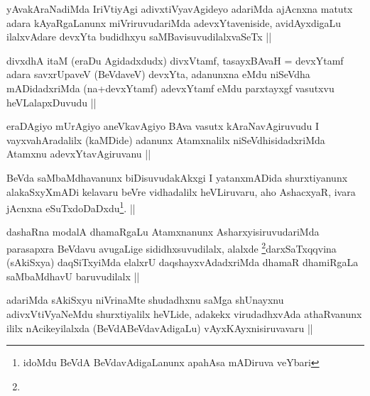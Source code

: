 \begin{artha}
yAvakAraNadiMda IriVtiyAgi adivxtiVyavAgideyo adariMda ajAcnxna matutx
adara kAyaRgaLanunx miVriruvudariMda adevxYtaveniside, avidAyxdigaLu
ilalxvAdare devxYta budidhxyu saMBavisuvudilalxvaSeTx ||
\end{artha}


\begin{artha}
divxdhA itaM (eraDu Agidadxdudx) divxVtamf, tasayxBAvaH = devxYtamf
adara savxrUpaveV (BeVdaveV) devxYta, adanunxna eMdu niSeVdha
mADidadxriMda (na+devxYtamf) adevxYtamf eMdu parxtayxgf vasutxvu
heVLalapxDuvudu ||  
\end{artha}


\begin{artha}
eraDAgiyo mUrAgiyo aneVkavAgiyo BAva vasutx kAraNavAgiruvudu I
vayxvahAradalilx (kaMDide) adanunx Atamxnalilx niSeVdhisidadxriMda
Atamxnu adevxYtavAgiruvanu ||
\end{artha}


\begin{artha}
BeVda saMbaMdhavanunx biDisuvudakAkxgi I yatanxmADida shurxtiyanunx
alakaSxyXmADi kelavaru beVre vidhadalilx heVLiruvaru, aho AshacxyaR,
ivara jAcnxna eSuTxdoDaDxdu\footnote[1]{idoMdu BeVdA BeVdavAdigaLanunx
apahAsa mADiruva veYbari}. ||
\end{artha}

\begin{artha}
dashaRna modalA dhamaRgaLu Atamxnanunx AsharxyisiruvudariMda
parasapxra BeVdavu avugaLige sididhxsuvudilalx,
alalxde \footnote[1]{}darxSaTxqqvina (sAkiSxya) daqSiTxyiMda elalxrU
daqshayxvAdadxriMda dhamaR dhamiRgaLa saMbaMdhavU baruvudilalx ||
\end{artha}


\begin{artha}
adariMda sAkiSxyu niVrinaMte shudadhxnu saMga shUnayxnu
adivxVtiVyaNeMdu shurxtiyalilx heVLide, adakekx virudadhxvAda
athaRvanunx ililx nAcikeyilalxda (BeVdABeVdavAdigaLu)
vAyxKAyxnisiruvavaru ||
\end{artha}


